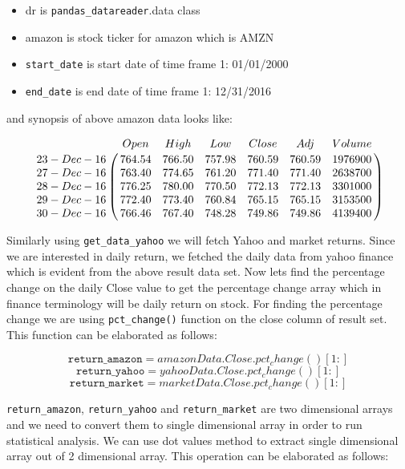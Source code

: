 \begin{itemize} 
\item dr is \texttt{pandas\_datareader}.data class
\item amazon is stock ticker for amazon which is \textquotesingle AMZN \textquotesingle
\item \texttt{start\_date} is start date of time frame 1: 01/01/2000
\item \texttt{end\_date} is end date of time frame 1: 12/31/2016
\end{itemize}

and synopsis of above amazon data looks like:

\indent

$$\bordermatrix{\text{}      &Open      &High      &Low      &Close     &Adj      &Volume   \cr
                23-Dec-16    & 764.54    &766.50   &757.98   &760.59    &760.59   &1976900  \cr
                27-Dec-16    & 763.40 	 &774.65   &761.20 	 &771.40 	&771.40   &2638700  \cr
                28-Dec-16    & 776.25 	 &780.00   &770.50 	 &772.13 	&772.13   &3301000  \cr
                29-Dec-16    & 772.40 	 &773.40   &760.84 	 &765.15 	&765.15   &3153500  \cr
                30-Dec-16    & 766.46 	 &767.40   &748.28 	 &749.86    &749.86   &4139400 \cr}$$
                
\indent 


Similarly using \texttt{get\_data\_yahoo} we will fetch Yahoo and market returns. Since we are interested in daily return, we fetched the daily data from yahoo 
finance which is evident from the above result data set. Now lets find the percentage change on the daily Close value to get the percentage change array which 
in finance terminology will be daily return on stock. For finding the percentage change we are using \texttt{pct\_change()} function on the close column of result set. 
This function can be elaborated as follows:

\indent

$$\texttt{return\_amazon} = amazonData.Close.pct_change()[1:]$$
$$\texttt{return\_yahoo}  = yahooData.Close.pct_change()[1:]$$
$$\texttt{return\_market} = marketData.Close.pct_change()[1:]$$

\indent 

\texttt{return\_amazon}, \texttt{return\_yahoo} and \texttt{return\_market} are two dimensional arrays and we need to convert them to single dimensional array 
in order to run statistical analysis. We can use dot values method to extract single dimensional array out of 2 dimensional array. This operation can be elaborated
as follows:

